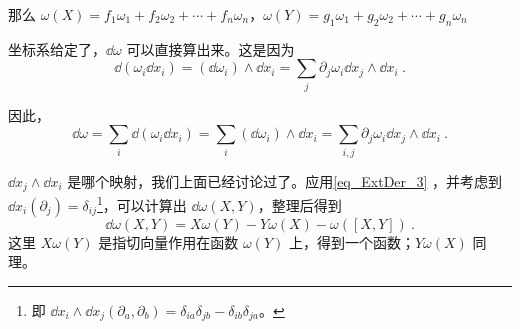 那么 $\omega(X)=f_1\omega_1+f_2\omega_2+\cdots+f_n\omega_n$，$\omega(Y)=g_1\omega_1+g_2\omega_2+\cdots+g_n\omega_n$

坐标系给定了，$\dd \omega$ 可以直接算出来。这是因为
\begin{equation}
\dd (\omega_i\dd x_i)=(\dd \omega_i)\wedge\dd x_i=\sum_{j}\partial_j\omega_i\dd x_j\wedge\dd x_i~.
\end{equation}

因此，
\begin{equation}
\dd \omega=\sum_{i}\dd (\omega_i\dd x_i)=\sum_{i}(\dd \omega_i)\wedge\dd x_i=\sum_{i, j}\partial_j\omega_i\dd x_j\wedge\dd x_i~.
\end{equation}

$\dd x_j\wedge\dd x_i$ 是哪个映射，我们上面已经讨论过了。应用\autoref{eq_ExtDer_3} ，并考虑到 $\dd x_i(\partial _j)=\delta_{ij}$\footnote{即 $\dd x_i\wedge \dd x_j(\partial_a, \partial_b)=\delta_{ia}\delta_{jb}-\delta_{ib}\delta_{ja}$。}，可以计算出 $\dd \omega(X, Y)$，整理后得到
\begin{equation}
\dd \omega(X, Y)=X\omega(Y)-Y\omega(X)-\omega([X, Y])~.
\end{equation}
这里 $X\omega(Y)$ 是指切向量作用在函数 $\omega(Y)$ 上，得到一个函数；$Y\omega(X)$ 同理。













